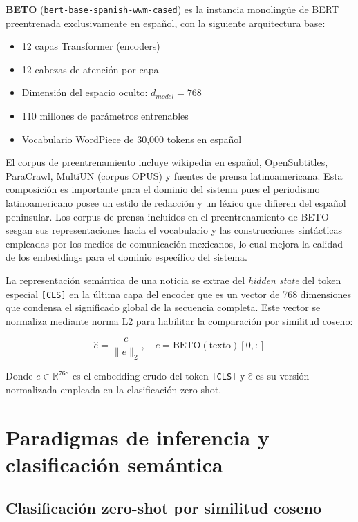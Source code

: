 \textbf{BETO} \cite{canete2020beto} (\texttt{bert-base-spanish-wwm-cased})
es la instancia monolingüe de BERT preentrenada exclusivamente en español, con la
siguiente arquitectura base:

\begin{itemize}
    \item 12 capas Transformer (encoders)
    \item 12 cabezas de atención por capa
    \item Dimensión del espacio oculto: $d_{model} = 768$
    \item 110 millones de parámetros entrenables
    \item Vocabulario WordPiece de 30{,}000 tokens en español
\end{itemize}

El corpus de preentrenamiento incluye wikipedia en español,
OpenSubtitles, ParaCrawl, MultiUN (corpus OPUS) y fuentes de prensa latinoamericana.
Esta composición es importante para el dominio del sistema pues el periodismo latinoamericano
posee un estilo de redacción y un léxico que difieren del español peninsular. Los
corpus de prensa incluidos en el preentrenamiento de BETO sesgan sus representaciones
hacia el vocabulario y las construcciones sintácticas empleadas por los medios de
comunicación mexicanos, lo cual mejora la calidad de los embeddings para el dominio
específico del sistema.

La representación semántica de una noticia se extrae del \textit{hidden state} del
token especial \texttt{[CLS]} en la última capa del encoder que es un vector de 768
dimensiones que condensa el significado global de la secuencia completa. Este vector
se normaliza mediante norma L2 para habilitar la comparación por similitud coseno:

\begin{equation}
    \hat{e} = \frac{e}{\|e\|_2}, \quad e = \text{BETO}(\text{texto})[0, :]
\end{equation}

Donde $e \in \mathbb{R}^{768}$ es el embedding crudo del token \texttt{[CLS]} y
$\hat{e}$ es su versión normalizada empleada en la clasificación zero-shot.


\section{Paradigmas de inferencia y clasificación semántica}
\label{sec:mt_inferencia}


\subsection{Clasificación zero-shot por similitud coseno}
\label{subsec:mt_zeroshot}

